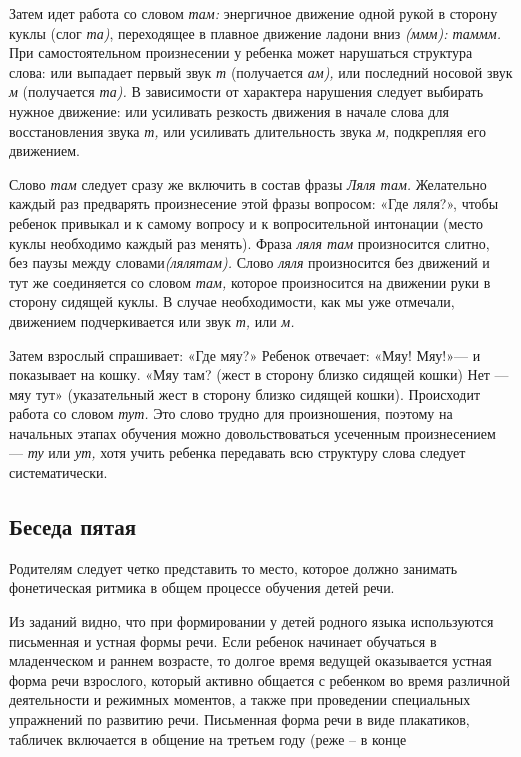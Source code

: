 \documentclass{book}
\renewcommand{\emph}[1]{\textit{#1}}
\begin{document}
Затем идет работа со словом \emph{там:} энергичное движение одной рукой
в сторону куклы (слог \emph{та)}, переходящее в плавное движение ладони
вниз \emph{(ммм): таммм.} При самостоятельном произнесении у ребенка
может нарушаться структура слова: или выпадает первый звук \emph{т}
(получается \emph{ам),} или последний носовой звук \emph{м} (получается
\emph{та).} В зависимости от характера нарушения следует выбирать нужное
движение: или усиливать резкость движения в начале слова для
восстановления звука \emph{т,} или усиливать длительность звука
\emph{м,} подкрепляя его движением.

Слово \emph{там} следует сразу же включить в состав фразы \emph{Ляля
там.} Желательно каждый раз предварять произнесение этой фразы вопросом:
«Где ляля?», чтобы ребенок привыкал и к самому вопросу и к
вопросительной интонации (место куклы необходимо каждый раз менять).
Фраза \emph{ляля там} произносится слитно, без паузы между
словами\emph{(лялятам).} Слово \emph{ляля} произносится без движений и
тут же соединяется со словом \emph{там,} которое произносится на
движении руки в сторону сидящей куклы. В случае необходимости, как мы
уже отмечали, движением подчеркивается или звук \emph{т,} или \emph{м.}

Затем взрослый спрашивает: «Где мяу?» Ребенок отвечает: «Мяу! Мяу!»--- и
показывает на кошку. «Мяу там? (жест в сторону близко сидящей кошки) Нет
--- мяу тут» (указательный жест в сторону близко сидящей кошки).
Происходит работа со словом \emph{тут.} Это слово трудно для
произношения, поэтому на начальных этапах обучения можно
довольствоваться усеченным произнесением --- \emph{ту} или \emph{ут,}
хотя учить ребенка передавать всю структуру слова следует
систематически.

\subsection*{Беседа пятая}

Родителям следует четко представить то место, которое должно занимать
фонетическая ритмика в общем процессе обучения детей речи.

Из заданий видно, что при формировании у детей родного языка
используются письменная и устная формы речи. Если ребенок начинает
обучаться в младенческом и раннем возрасте, то долгое время ведущей
оказывается устная форма речи взрослого, который активно общается с
ребенком во время различной деятельности и режимных моментов, а также
при проведении специальных упражнений по развитию речи. Письменная форма
речи в виде плакатиков, табличек включается в общение на третьем году
(реже -- в конце
\end{document}
